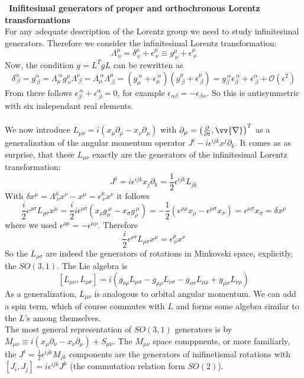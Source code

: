 \documentclass{include/thesisclass}
\newcommand{\p}{\partial}
\newcommand{\OO}{\mathcal{O}}
\newcommand{\eps}{\epsilon}
\newcommand{\vn}{\vv{\nabla}}
\newcommand{\sub}[1]{~\newline\newline\textbf{#1}\\}
\begin{document}
\sub{Inifitesimal generators of proper and orthochronous Lorentz transformations}
For any adequate description of the Lorentz group we need to study infinitesimal generators. Therefore we consider the infinitesimal Lorentz transformation:
\[ \Lambda^\mu_{~\nu} = \delta^\mu_{~\nu} + \eps^\mu_{~\nu} \equiv g^\mu_{~\nu} + \eps^\mu_{~\nu}\]
Now, the condition $g = L^T g L$ can be rewritten as 
\[ \delta^\alpha_{~\beta} = g^\alpha_{~\beta} = \Lambda_\mu^{~\alpha} g^\mu_{~\nu}\Lambda^\nu_{~\beta} = \Lambda_\mu^{~\alpha}\Lambda^\mu_{~\beta} = ( g_\mu^{~\alpha} + \eps_\mu^{~\alpha})(g^\mu_{~\beta} + \eps^\mu_{~\beta}) = g_\beta^{~\alpha} \eps_\beta^{~\alpha} + \eps^\alpha_{~\beta} + \OO(\eps^2)\]
From there follows $\eps_\beta^{~\alpha} + \eps^\alpha_{~\beta} = 0$, for example $\eps_{\alpha\beta} = - \eps_{\beta\alpha}$. So this is antisymmetric with six independant real elements.\\
\\
We now introduce $L_{\mu\nu} = i ( x_\mu \p_\mu - x_\nu\p_\mu)$ with $\p_\mu = \left( \frac{\p}{\p t}, \vn\right)^T$ as a generalization of the angular momentum operator $J^i -i \eps^{ijk} x^j \p_k$. It comes as as surprise, that these $L_{\mu\nu}$ exactly are the generators of the infinitesimal Lorentz transformation:
\[J^i = i \eps^{ijk} x_j \p _k = \frac{1}{2}\eps^{ijk} L_{jk}\]
With $\delta x^\mu = \Lambda^\mu_{~\nu} x^\nu - x^\mu = \eps^\mu_{~\nu} x^\nu$ it follows
\[ \frac{i}{2} e^{\rho\sigma} L_{\rho\sigma} x^\mu = \frac{i}{2} i \eps^{\rho\sigma} ( x_\rho g_\sigma^{~\mu}- x_\sigma g_\rho^{~\mu}) = - \frac{1}{2} (e^{\rho\mu} x_\rho - \eps^{\mu\sigma}x_\sigma )= \eps^{\mu\sigma}x_\sigma = \delta x^\mu\]
where we used $\eps^{\rho\mu} = - \eps^{\mu\rho}$. Therefore
\[ \frac{i}{2}\eps^{\rho\sigma} L_{\rho\sigma} x^\mu = \eps^\mu_{~\nu} x^\nu\]
So the $L_{\rho\sigma}$ are indeed the generators of rotations in Minkovski space, explicitly, the $SO(3,1)$. The Lie algebra is
\[ [L_{\mu\nu}, L_{\rho\sigma}] = i ( g_{\nu\rho} L_{\mu\sigma} - g_{\mu\rho}L_{\nu\sigma} - g_{\nu\sigma}L_{\mu\rho} + g_{\mu\sigma}L_{\nu\rho})\]
\newline
As a generalization, $L_{\mu\nu}$ is analogous to orbital angular momentum. We can add a spin term, which of course commutes with $L$ and forms some algebra similar to the $L$'s among themselves.\\
The most general representation of $SO(3,1)$ generators is by $M_{\mu\nu} \equiv i(x_\mu \p_\nu - x_\nu\p_\mu) + S_{\mu\nu}$. The $M_{\mu\nu}$ space comppnents, or more familiarly, the $J^i = \frac{1}{2} \eps^{ijk} M_{jk}$ components are the generators of inifinetismal rotations with $[J_i, J_j] = i \eps^{ijk} J^k$ (the commutation relation form $SO(2)$).\\
\end{document}
